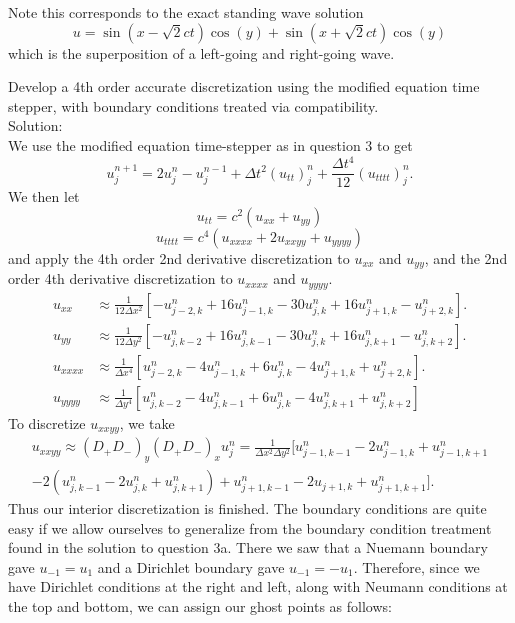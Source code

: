 Note this corresponds to the exact standing wave solution
$$u=\sin(x-\sqrt{2}ct)\cos(y)+\sin(x+\sqrt{2}ct)\cos(y)$$
which is the superposition of a left-going and right-going wave.

\benum
\item Develop a 4th order accurate discretization using the modified equation time stepper, with boundary conditions treated via compatibility.\\

Solution:\\
We use the modified equation time-stepper as in question 3 to get
$$u_j^{n+1}=2u_j^n-u_j^{n-1}+\Delta t^2 (u_{tt})_j^n+\frac{\Delta t^4}{12}(u_{tttt})_j^n.$$
We then let
$$u_{tt}=c^2(u_{xx}+u_{yy})$$
$$u_{tttt}=c^4(u_{xxxx}+2u_{xxyy}+u_{yyyy})$$
and apply the 4th order 2nd derivative discretization to $u_{xx}$ and $u_{yy}$, and the 2nd order 4th derivative discretization to $u_{xxxx}$ and $u_{yyyy}$.
\begin{align*}
u_{xx}&\approx \frac{1}{12\Delta x^2}[-u_{j-2,k}^n+16u_{j-1,k}^n-30u_{j,k}^n+16u_{j+1,k}^n-u_{j+2,k}^n].\\
u_{yy}&\approx \frac{1}{12\Delta y^2}[-u_{j,k-2}^n+16u_{j,k-1}^n-30u_{j,k}^n+16u_{j,k+1}^n-u_{j,k+2}^n].\\
u_{xxxx}&\approx\frac{1}{\Delta x^4}[u_{j-2,k}^n-4u_{j-1,k}^n+6u_{j,k}^n-4u_{j+1,k}^n+u_{j+2,k}^n].\\
u_{yyyy}&\approx\frac{1}{\Delta y^4}[u_{j,k-2}^n-4u_{j,k-1}^n+6u_{j,k}^n-4u_{j,k+1}^n+u_{j,k+2}^n]
\end{align*}
 To discretize $u_{xxyy}$, we take
\begin{multline*}
u_{xxyy}\approx (D_+D_-)_y(D_+D_-)_xu_j^n=\frac{1}{\Delta x^2\Delta y^2}[u_{j-1,k-1}^n-2u_{j-1,k}^n+u_{j-1,k+1}^n\\
-2(u_{j,k-1}^n-2u_{j,k}^n+u_{j,k+1}^n)+u_{j+1,k-1}^n-2u_{j+1,k}+u_{j+1,k+1}^n].
\end{multline*}
Thus our interior discretization is finished. The boundary conditions are quite easy if we allow ourselves to generalize from the boundary condition treatment found in the solution to question 3a. There we saw that a Nuemann boundary gave $u_{-1}=u_1$ and a Dirichlet boundary gave $u_{-1}=-u_1.$ Therefore, since we have Dirichlet conditions at the right and left, along with Neumann conditions at the top and bottom, we can assign our ghost points as follows:

